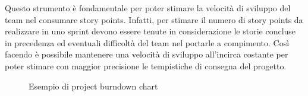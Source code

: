 Questo strumento è fondamentale per poter stimare la velocità di sviluppo del team nel consumare story points. Infatti, per stimare il numero di story points da realizzare in uno sprint devono essere tenute in considerazione le storie concluse in precedenza ed eventuali difficoltà del team nel portarle a compimento.
Così facendo è possibile mantenere una velocità di sviluppo all'incirca costante per poter stimare con maggior precisione le tempistiche di consegna del progetto.

\begin{figure}
  \centering
  \caption{Esempio di project burndown chart}
  \label{fig:project-burndown-chart}
  \end{figure}

